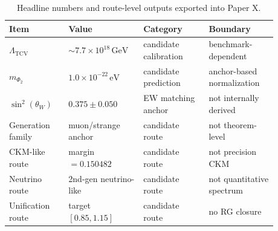 \begin{table}[ht]
\centering
\footnotesize
\setlength{\tabcolsep}{4pt}
\begin{tabular}{L{0.20\linewidth}L{0.23\linewidth}L{0.22\linewidth}L{0.23\linewidth}}
\toprule
Item & Value & Category & Boundary \\
\midrule
$\Lambda_{\mathrm{TCV}}$ & $\sim 7.7\times 10^{18}\,\mathrm{GeV}$ & candidate calibration & benchmark-dependent \\
$m_{\Phi_2}$ & $1.0\times 10^{-22}\,\mathrm{eV}$ & candidate prediction & anchor-based normalization \\
$\sin^2(\theta_W)$ & $0.375\pm0.050$ & EW matching anchor & not internally derived \\
Generation family & muon/strange anchor & candidate route & not theorem-level \\
CKM-like route & margin $=0.150482$ & candidate route & not precision CKM \\
Neutrino route & 2nd-gen neutrino-like & candidate route & not quantitative spectrum \\
Unification route & target $[0.85,1.15]$ & candidate route & no RG closure \\
\bottomrule
\end{tabular}
\caption{Headline numbers and route-level outputs exported into Paper X.}
\label{tab:prediction-routes}
\end{table}

